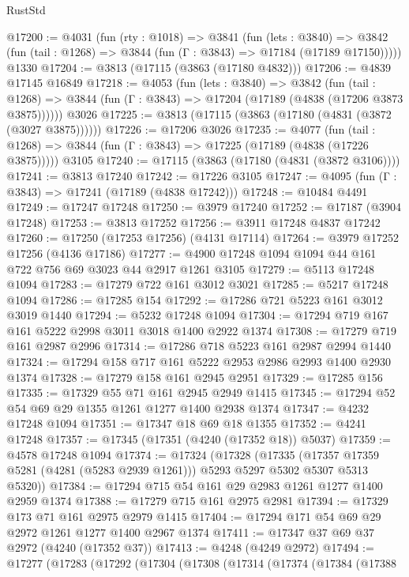 \begin{lexlean}{RustStd}
\begin{coremodule}
@17200 := @4031
    (fun (rty : @1018) =>
    @3841
      (fun (lets : @3840) =>
      @3842 (fun (tail : @1268) => @3844 (fun (Γ : @3843) => @17184 (@17189 @17150)))))
    @1330
@17204 := @3813 (@17115 (@3863 (@17180 @4832)))
@17206 := @4839 @17145 @16849
@17218 := @4053
    (fun (lets : @3840) =>
    @3842
      (fun (tail : @1268) =>
      @3844 (fun (Γ : @3843) => @17204 (@17189 (@4838 (@17206 @3873 @3875))))))
    @3026
@17225 := @3813 (@17115 (@3863 (@17180 (@4831 (@3872 (@3027 @3875))))))
@17226 := @17206 @3026
@17235 := @4077
    (fun (tail : @1268) => @3844 (fun (Γ : @3843) => @17225 (@17189 (@4838 (@17226 @3875)))))
    @3105
@17240 := @17115 (@3863 (@17180 (@4831 (@3872 @3106))))
@17241 := @3813 @17240
@17242 := @17226 @3105
@17247 := @4095 (fun (Γ : @3843) => @17241 (@17189 (@4838 @17242)))
@17248 := @10484 @4491
@17249 := @17247 @17248
@17250 := @3979 @17240
@17252 := @17187 (@3904 @17248)
@17253 := @3813 @17252
@17256 := @3911 @17248 @4837 @17242
@17260 := @17250 (@17253 @17256) (@4131 @17114)
@17264 := @3979 @17252 @17256 (@4136 @17186)
@17277 := @4900 @17248 @1094 @1094 @44 @161 @722 @756 @69 @3023 @44 @2917 @1261 @3105
@17279 := @5113 @17248 @1094
@17283 := @17279 @722 @161 @3012 @3021
@17285 := @5217 @17248 @1094
@17286 := @17285 @154
@17292 := @17286 @721 @5223 @161 @3012 @3019 @1440
@17294 := @5232 @17248 @1094
@17304 := @17294 @719 @167 @161 @5222 @2998 @3011 @3018 @1400 @2922 @1374
@17308 := @17279 @719 @161 @2987 @2996
@17314 := @17286 @718 @5223 @161 @2987 @2994 @1440
@17324 := @17294 @158 @717 @161 @5222 @2953 @2986 @2993 @1400 @2930 @1374
@17328 := @17279 @158 @161 @2945 @2951
@17329 := @17285 @156
@17335 := @17329 @55 @71 @161 @2945 @2949 @1415
@17345 := @17294 @52 @54 @69 @29 @1355 @1261 @1277 @1400 @2938 @1374
@17347 := @4232 @17248 @1094
@17351 := @17347 @18 @69 @18 @1355
@17352 := @4241 @17248
@17357 := @17345 (@17351 (@4240 (@17352 @18)) @5037)
@17359 := @4578 @17248 @1094
@17374 := @17324
    (@17328
      (@17335
        (@17357 @17359 @5281 (@4281 (@5283 @2939 @1261)))
        @5293
        @5297
        @5302
        @5307
        @5313
        @5320))
@17384 := @17294 @715 @54 @161 @29 @2983 @1261 @1277 @1400 @2959 @1374
@17388 := @17279 @715 @161 @2975 @2981
@17394 := @17329 @173 @71 @161 @2975 @2979 @1415
@17404 := @17294 @171 @54 @69 @29 @2972 @1261 @1277 @1400 @2967 @1374
@17411 := @17347 @37 @69 @37 @2972 (@4240 (@17352 @37))
@17413 := @4248 (@4249 @2972)
@17494 := @17277
    (@17283
      (@17292
        (@17304
          (@17308
            (@17314
              (@17374
                (@17384
                  (@17388

\end{coremodule}
\end{lexlean}

